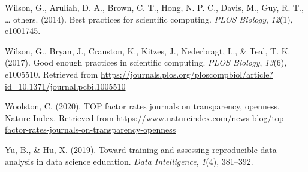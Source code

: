 \documentclass[12pt,twoside]{reedthesis}
\newenvironment{CSLReferences}%
  {}%
  {\par}
\begin{document}
\begin{CSLReferences}{1}{0}
\leavevmode\hypertarget{ref-wilson2014best}{}%
Wilson, G., Aruliah, D. A., Brown, C. T., Hong, N. P. C., Davis, M., Guy, R. T., \ldots{} others. (2014). Best practices for scientific computing. \emph{PLOS Biology}, \emph{12}(1), e1001745.

\leavevmode\hypertarget{ref-wilson2017good}{}%
Wilson, G., Bryan, J., Cranston, K., Kitzes, J., Nederbragt, L., \& Teal, T. K. (2017). Good enough practices in scientific computing. \emph{PLOS Biology}, \emph{13}(6), e1005510. Retrieved from \url{https://journals.plos.org/ploscompbiol/article?id=10.1371/journal.pcbi.1005510}

\leavevmode\hypertarget{ref-top-guidelines}{}%
Woolston, C. (2020). TOP factor rates journals on transparency, openness. Nature Index. Retrieved from \url{https://www.natureindex.com/news-blog/top-factor-rates-journals-on-transparency-openness}

\leavevmode\hypertarget{ref-yu2019toward}{}%
Yu, B., \& Hu, X. (2019). Toward training and assessing reproducible data analysis in data science education. \emph{Data Intelligence}, \emph{1}(4), 381--392.

\end{CSLReferences}

\end{document}
